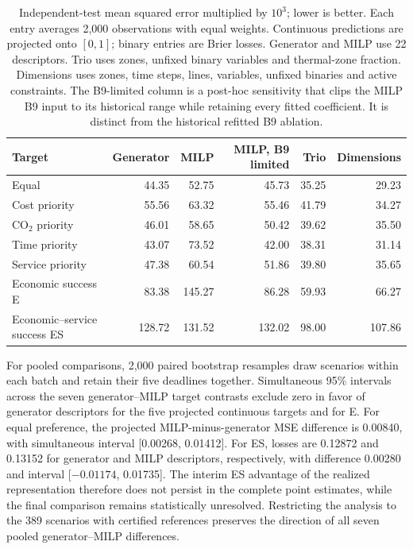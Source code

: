 \begin{table}[htbp]
\centering\small\setlength{\tabcolsep}{4pt}
\begin{tabular}{lrrrrr}
\toprule
Target & Generator & MILP & MILP, B9 limited & Trio & Dimensions\\
\midrule
Equal & 44.35 & 52.75 & 45.73 & 35.25 & 29.23\\
Cost priority & 55.56 & 63.32 & 55.46 & 41.79 & 34.27\\
CO$_2$ priority & 46.01 & 58.65 & 50.42 & 39.62 & 35.50\\
Time priority & 43.07 & 73.52 & 42.00 & 38.31 & 31.14\\
Service priority & 47.38 & 60.54 & 51.86 & 39.80 & 35.65\\
\midrule
Economic success E & 83.38 & 145.27 & 86.28 & 59.93 & 66.27\\
Economic--service success ES & 128.72 & 131.52 & 132.02 & 98.00 & 107.86\\
\bottomrule
\end{tabular}
\caption{Independent-test mean squared error multiplied by $10^3$; lower is
better. Each entry averages 2,000 observations with equal weights. Continuous
predictions are projected onto $[0,1]$; binary entries are Brier losses.
Generator and MILP use 22 descriptors. Trio uses zones, unfixed binary
variables and thermal-zone fraction. Dimensions uses zones, time steps,
lines, variables, unfixed binaries and active constraints. The B9-limited
column is a post-hoc sensitivity that clips the MILP B9 input to its
historical range while retaining every fitted coefficient. It is distinct
from the historical refitted B9 ablation.}
\label{tab:final_independent_descriptors}
\end{table}

For pooled comparisons, 2,000 paired bootstrap resamples draw scenarios
within each batch and retain their five deadlines together. Simultaneous
95\% intervals across the seven generator--MILP target contrasts exclude
zero in favor of generator descriptors for the five projected continuous
targets and for E. For equal preference, the projected MILP-minus-generator
MSE difference is 0.00840, with simultaneous interval [0.00268, 0.01412].
For ES, losses are 0.12872 and 0.13152 for generator and MILP descriptors,
respectively, with difference 0.00280 and interval [$-0.01174$, 0.01735].
The interim ES advantage of the realized representation therefore does not
persist in the complete point estimates, while the final comparison remains
statistically unresolved. Restricting the analysis to the 389 scenarios
with certified references preserves the direction of all seven pooled
generator--MILP differences.

